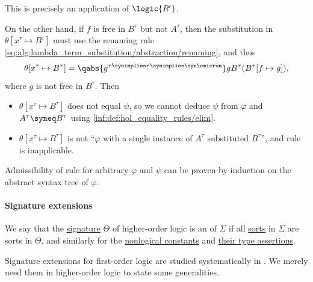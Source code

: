 \begin{example}
  This is precisely an application of \( \logic{R'} \).

  On the other hand, if \( f \) is free in \( B^\tau \) but not \( A^\tau \), then the substitution in \( \theta[x^\tau \mapsto B^\tau] \) must use the renaming rule \eqref{eq:alg:lambda_term_substitution/abstraction/renaming}, and thus
  \begin{equation*}
    \theta[x^\tau \mapsto B^\tau] = \qabs {g^{\tau \synimplies \tau \synimplies \syn\omicron}} g B^\tau (B^\tau[f \mapsto g]),
  \end{equation*}
  where \( g \) is not free in \( B^\tau \). Then
  \begin{itemize}
    \item \( \theta[x^\tau \mapsto B^\tau] \) does not equal \( \psi \), so we cannot deduce \( \psi \) from \( \varphi \) and \( A^\tau \syneq B^\tau \) using \ref{inf:def:hol_equality_rules/elim}.

    \item \( \theta[x^\tau \mapsto B^\tau] \) is not \enquote{\( \varphi \) with a single instance of \( A^\tau \) substituted \( B^\tau \)}, and rule  is inapplicable.
  \end{itemize}

  Admissibility of rule  for arbitrary \( \varphi \) and \( \psi \) can be proven by induction on the abstract syntax tree of \( \varphi \).
\end{example}

\paragraph{Signature extensions}

\begin{definition}\label{def:hol_signature_extension}\mimprovised
  We say that the \hyperref[def:hol_signature]{signature} \( \Theta \) of higher-order logic is an  of \( \Sigma \) if all \hyperref[def:hol_signature/sorts]{sorts} in \( \Sigma \) are sorts in \( \Theta \), and similarly for the \hyperref[def:hol_signature/nl_const]{nonlogical constants} and \hyperref[def:hol_signature/nl_type]{their type assertions}.
\end{definition}
\begin{comments}
  \item Signature extensions for first-order logic are studied systematically in . We merely need them in higher-order logic to state some generalities.
\end{comments}

